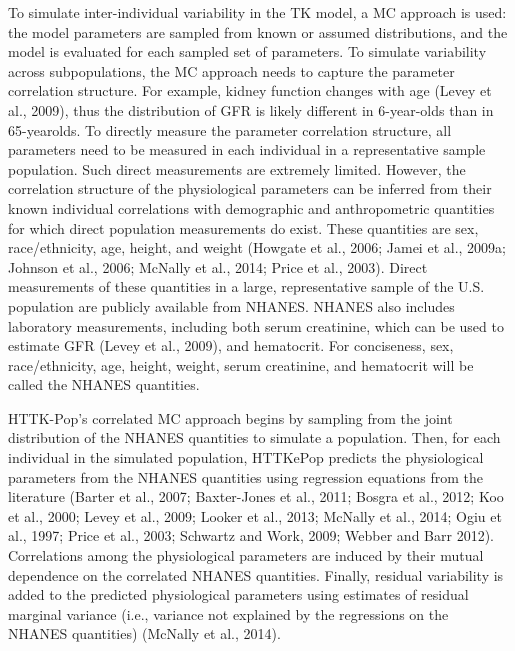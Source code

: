 \documentclass[a4paper]{book}
\begin{document}
\begin{Details}\relax
To simulate inter-individual variability in the TK model, a MC approach
is used: the model parameters are sampled from known or assumed
distributions, and the model is evaluated for each sampled set of
parameters. To simulate variability across subpopulations, the MC approach
needs to capture the parameter correlation structure. For example,
kidney function changes with age (Levey et al., 2009), thus the
distribution of GFR is likely different in 6-year-olds than in 65-yearolds.
To directly measure the parameter correlation structure, all parameters
need to be measured in each individual in a representative
sample population. Such direct measurements are extremely limited.
However, the correlation structure of the physiological parameters can
be inferred from their known individual correlations with demographic
and anthropometric quantities for which direct population measurements
do exist. These quantities are sex, race/ethnicity, age, height, and
weight (Howgate et al., 2006; Jamei et al., 2009a; Johnson et al., 2006;
McNally et al., 2014; Price et al., 2003). Direct measurements of these
quantities in a large, representative sample of the U.S. population are
publicly available from NHANES. NHANES also includes laboratory
measurements, including both serum creatinine, which can be used to
estimate GFR (Levey et al., 2009), and hematocrit. For conciseness, sex,
race/ethnicity, age, height, weight, serum creatinine, and hematocrit
will be called the NHANES quantities.

HTTK-Pop's correlated MC approach begins by sampling from the
joint distribution of the NHANES quantities to simulate a population.
Then, for each individual in the simulated population, HTTKePop
predicts the physiological parameters from the NHANES
quantities using regression equations from the literature (Barter et al.,
2007; Baxter-Jones et al., 2011; Bosgra et al., 2012; Koo et al., 2000;
Levey et al., 2009; Looker et al., 2013; McNally et al., 2014; Ogiu et al.,
1997; Price et al., 2003; Schwartz and Work, 2009; Webber and Barr 2012). 
Correlations among the physiological parameters are induced by
their mutual dependence on the correlated NHANES quantities. Finally,
residual variability is added to the predicted physiological parameters
using estimates of residual marginal variance (i.e., variance not explained
by the regressions on the NHANES quantities) (McNally et al.,
2014).


\end{Details}
\end{document}
